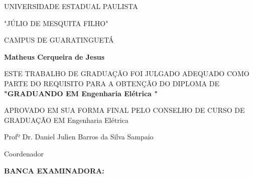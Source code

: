 \documentclass[
  12pt,		%
  a4paper,	%
  openright,%
  oneside,	%
  chapter=TITLE,		%
  section=TITLE,		%
  english,	%
  french,	%
  spanish,	%
  brazil	%
]{abntex2}
\newcommand{\nomeDoAutor}{
    Matheus Cerqueira de Jesus
    }
\newcommand{\nomeDoCurso}{
    Engenharia Elétrica
    }
\newcommand{\nomeDoCoordenador}{
    Daniel Julien Barros da Silva Sampaio
    }
\newcommand{\tituloDoCoordenador}{
    Profº Dr.
    }
\begin{document}
    
    \imprimircapa
    \imprimirfolhaderosto
    
    \begin{folhadeaprovacao}
        \begin{center}
        
        {\sffamily
            \bfseries{
                \Large{
                    UNIVERSIDADE ESTADUAL PAULISTA\par
                    "JÚLIO DE MESQUITA FILHO"\par
                }
            }
            CAMPUS DE GUARATINGUETÁ
        }
        
        \vspace*{3cm}
                
        \normalsize{\textbf{\MakeUppercase\nomeDoAutor}}
        
        \vspace*{1cm}
        
        \begin{framed}
            ESTE TRABALHO DE GRADUAÇÃO FOI JULGADO ADEQUADO COMO PARTE DO REQUISITO PARA A OBTENÇÃO DO DIPLOMA DE \textbf{"GRADUANDO EM {\MakeUppercase\nomeDoCurso}"}
            \par
            \vspace*{1cm}
            APROVADO EM SUA FORMA FINAL PELO CONSELHO DE CURSO DE GRADUAÇÃO EM {\MakeUppercase\nomeDoCurso}
            \par
            \vspace*{1cm}
            \begin{flushright}
            \tituloDoCoordenador {\MakeUppercase\nomeDoCoordenador}
            \par
            Coordenador
            \end{flushright}
       \end{framed}
       
       \begin{flushleft}
            \textbf{BANCA EXAMINADORA:}
       \end{flushleft}
       

\end{center}
\end{folhadeaprovacao}
\end{document}

